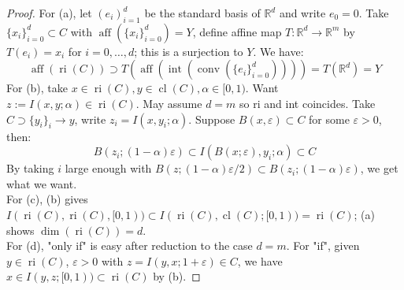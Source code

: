 \begin{proof}
	For (a), let $(e_i)_{i=1}^d$ be the standard basis of $\mathbb{R}^d$ and write $e_0=0$. Take $\{x_i\}_{i=0}^d\subset C$ with $\operatorname{aff}(\{x_i\}_{i=0}^d)=Y$, define affine map $T:\mathbb{R}^d\to \mathbb{R}^m$ by $T(e_i)=x_i$ for $i=0,\dotsc,d$; this is a surjection to $Y$. We have:
	\[
		\operatorname{aff}(\operatorname{ri}(C)) \supset T\left(\operatorname{aff}\left(\operatorname{int}\left(\operatorname{conv}\left(\{e_i\}_{i=0}^d\right)\right)\right)\right)=T(\mathbb{R}^d)=Y
	\]
	For (b), take $x\in \operatorname{ri}(C),y\in \operatorname{cl}(C), \alpha \in[0, 1)$. Want $z:=I(x, y; \alpha )\in\operatorname{ri}(C)$. May assume $d=m$ so ri and int coincides. Take $C\supset\{y_i\}_i\to y$, write $z_i=I(x,y_i;\alpha )$. Suppose $B(x,\varepsilon )\subset C$ for some $\varepsilon >0$, then:
	\[
		B(z_i;(1-\alpha )\varepsilon )\subset I(B(x;\varepsilon ),y_i;\alpha)\subset C
	\]
	By taking $i$ large enough with $B(z;(1-\alpha )\varepsilon /2)\subset B(z_i;(1-\alpha )\varepsilon )$, we get what we want.\\
	For (c), (b) gives $I(\operatorname{ri}(C),\operatorname{ri}(C),[0, 1))\subset I(\operatorname{ri}(C),\operatorname{cl}(C);[0,1))=\operatorname{ri}(C)$; (a) shows $\operatorname{dim}(\operatorname{ri}(C))=d$.\\
	For (d), "only if" is easy after reduction to the case $d=m$. For "if", given $y\in \operatorname{ri}(C)$, $\varepsilon>0$ with $z=I(y,x;1+\varepsilon )\in C$, we have $x\in I(y,z;[0,1))\subset \operatorname{ri}(C)$ by (b).
\end{proof}

